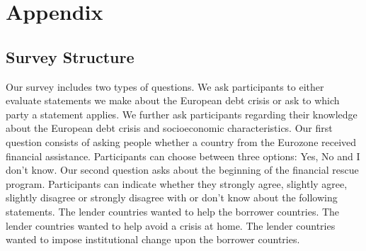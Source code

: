 \section{Appendix}
\subsection{Survey Structure}
Our survey includes two types of questions. We ask participants to either evaluate statements we make about the European debt crisis or ask to which party a statement applies. We further ask participants regarding their knowledge about the European debt crisis and socioeconomic characteristics. Our first question consists of asking people whether a country from the Eurozone received financial assistance. Participants can choose between three options: Yes, No and I don't know. Our second question asks about the beginning of the financial rescue program. 
Participants can indicate whether they strongly agree, slightly agree, slightly disagree or strongly disagree with or don't know about the following statements. 
The lender countries wanted to help the borrower countries. The lender countries wanted to help avoid a crisis at home. The lender countries wanted to impose institutional change upon the borrower countries. 
